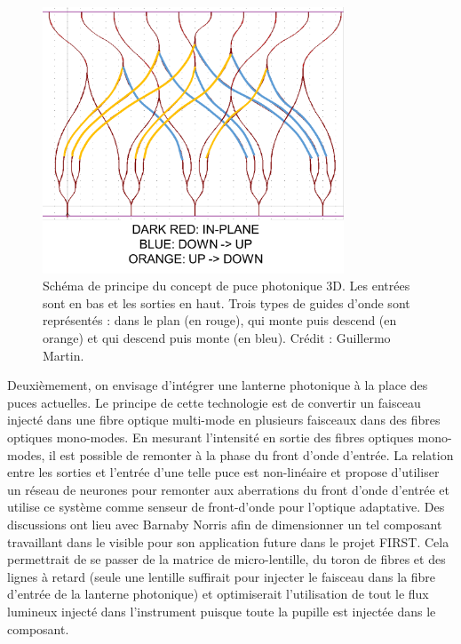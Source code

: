 \begin{figure}[ht!]
    \centering
    \includegraphics[width=0.8\textwidth]{Figure_Chap1/Martin2022_FIRST573D_Figure1.png}
    \caption[Schéma de principe du concept de puce photonique 3D.]{Schéma de principe du concept de puce photonique 3D. Les entrées sont en bas et les sorties en haut. Trois types de guides d'onde sont représentés : dans le plan (en rouge), qui monte puis descend (en orange) et qui descend puis monte (en bleu). Crédit : Guillermo Martin.}
    \label{fig:Chip5T3D}
\end{figure}

Deuxièmement, on envisage d'intégrer une lanterne photonique \citep{leonsaval2005} à la place des puces actuelles. Le principe de cette technologie est de convertir un faisceau injecté dans une fibre optique multi-mode en plusieurs faisceaux dans des fibres optiques mono-modes. En mesurant l'intensité en sortie des fibres optiques mono-modes, il est possible de remonter à la phase du front d'onde d'entrée. La relation entre les sorties et l'entrée d'une telle puce est non-linéaire et \cite{norris2020a} propose d'utiliser un réseau de neurones pour remonter aux aberrations du front d'onde d'entrée et utilise ce système comme senseur de front-d'onde pour l'optique adaptative. Des discussions ont lieu avec Barnaby Norris afin de dimensionner un tel composant travaillant dans le visible pour son application future dans le projet \ac{FIRST}. Cela permettrait de se passer de la matrice de micro-lentille, du toron de fibres et des lignes à retard (seule une lentille suffirait pour injecter le faisceau dans la fibre d'entrée de la lanterne photonique) et optimiserait l'utilisation de tout le flux lumineux injecté dans l'instrument puisque toute la pupille est injectée dans le composant.


